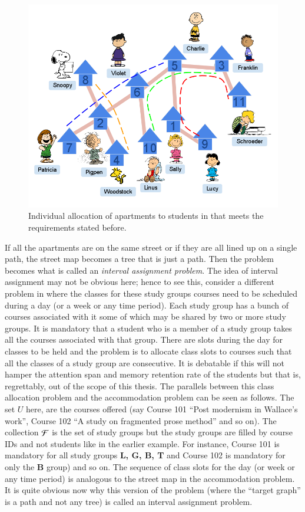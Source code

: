 \documentclass[MS,]{iitmdiss}
\begin{document}
\begin{figure}[h]
  \centering
  \includegraphics[scale=0.5]{../img/3_infinite_loop.png}
  \caption{Individual allocation of apartments to students in
    {\residenceblock} that meets the requirements stated before.}
  \label{fig:streetmappathpeople}
\end{figure}


If all the apartments are on the same street or if they are all lined
up on a single path, the street map becomes a tree that is just a
path. Then the problem becomes what is called an {\em interval
  assignment problem}. The idea of interval assignment may not be
obvious here; hence to see this, consider a different problem in
{\WSI} where the classes for these study groups courses need to be
scheduled during a day (or a week or any time period). Each study
group has a bunch of courses associated with it some of which may be
shared by two or more study groups. It is mandatory that a student who
is a member of a study group takes all the courses associated with
that group. There are slots during the day for classes to be held and
the problem is to allocate class slots to courses such that all the
classes of a study group are consecutive. It is debatable if this will
not hamper the attention span and memory retention rate of the students but
that is, regrettably, out of the scope of this thesis. The parallels between this
class allocation problem and the accommodation problem can be seen as
follows. The set $U$ here, are the courses offered (say Course 101 ``Post
modernism in Wallace's work'', Course 102 ``A study on fragmented prose
method'' and so on). The collection ${\cal F}$ is the set of study groups but the
study groups are filled by course IDs and not students like in the
earlier example. For instance, Course 101 is mandatory for all study
groups {\bf L, G, B, T} and Course 102 is mandatory for only the {\bf B}
group) and so on. The sequence of class slots for the day (or week or
any time period) is analogous to the street map in the accommodation
problem. It is quite obvious now why this version of the problem
(where the ``target graph'' is a path and not any tree) is called an
interval assignment problem. 
\end{document}
